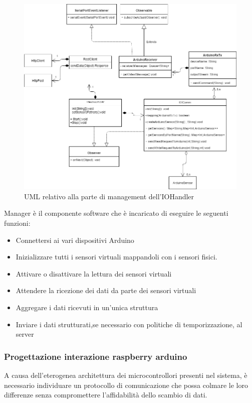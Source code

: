 \documentclass[12pt]{article}
\begin{document}
\begin{figure}[h!]
\centering
	\includegraphics[scale=0.55]{img/parteLocale/UmlManager.png}  
    \caption{UML relativo alla parte di management dell'IOHandler}
\end{figure}
Manager è il componente software che è incaricato di eseguire le seguenti funzioni:
\begin{itemize}
\item Connettersi ai vari dispositivi Arduino
\item Inizializzare tutti i sensori virtuali mappandoli con i sensori fisici.
\item Attivare o disattivare la lettura dei sensori virtuali
\item Attendere la ricezione dei dati da parte dei sensori virtuali
\item Aggregare i dati ricevuti in un'unica struttura
\item Inviare i dati strutturati,se necessario con politiche di temporizzazione, al server
\end{itemize}
\subsubsection{Progettazione interazione raspberry arduino}
A causa dell'eterogenea architettura dei microcontrollori presenti nel sistema, è necessario individuare un protocollo di comunicazione che possa colmare le loro differenze senza compromettere l'affidabilità dello scambio di dati.
\end{document}
